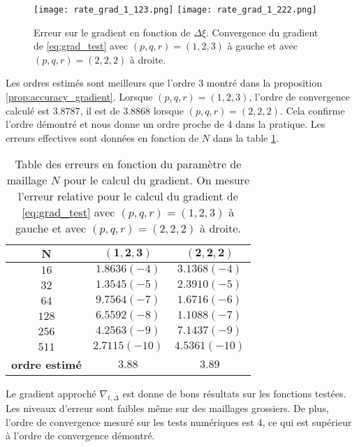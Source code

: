 \begin{figure}[htbp]
\begin{center}
\texttt{[image: rate\_grad\_1\_123.png]}
\texttt{[image: rate\_grad\_1\_222.png]}
\end{center}
\caption{Erreur sur le gradient en fonction de $\Delta \xi$. Convergence du gradient de \eqref{eq:grad_test} avec $(p,q,r)=(1,2,3)$ à gauche et avec $(p,q,r)=(2,2,2)$ à droite.}
\label{fig:rate_grad}
\end{figure}

Les ordres estimés sont meilleurs que l'ordre 3 montré dans la proposition \ref{prop:accuracy_gradient}. Lorsque $(p,q,r)=(1,2,3)$, l'ordre de convergence calculé est $3.8787$, il est de $3.8868$ lorsque $(p,q,r)=(2,2,2)$. Cela confirme l'ordre démontré et nous donne un ordre proche de $4$ dans la pratique. Les erreurs effectives sont données en fonction de $N$ dans la table \ref{tab:rate_grad}.

\begin{table}[htbp]
\begin{center}
\begin{tabular}{|c||c|c|}
\hline
$\mathbf{N}$    & $\mathbf{(1,2,3)}$     & $\mathbf{(2,2,2)}$     \\
\hline
\hline
$16$   & $1.8636 (-4)$ & $3.1368 (-4)$ \\
$32$   & $1.3545 (-5)$ & $2.3910 (-5)$ \\
$64$   & $9.7564 (-7)$ & $1.6716 (-6)$ \\
$128$  & $6.5592 (-8)$ & $1.1088 (-7)$ \\
$256$  & $4.2563 (-9)$ & $7.1437 (-9)$ \\
$511$  & $2.7115(-10)$ & $4.5361(-10)$ \\
\hline
\hline
\textbf{ordre estimé} & $3.88$ & $3.89$ \\
\hline 
\end{tabular}
\end{center}
\caption{Table des erreurs en fonction du paramètre de maillage $N$ pour le calcul du gradient. On mesure l'erreur relative pour le calcul du gradient de \eqref{eq:grad_test} avec $(p,q,r)=(1,2,3)$ à gauche et avec $(p,q,r)=(2,2,2)$ à droite.}
\label{tab:rate_grad}
\end{table}

Le gradient approché $\nabla_{t,\Delta}$ est donne de bons résultats sur les fonctions testées. Les niveaux d'erreur sont faibles même sur des maillages grossiers. De plus, l'ordre de convergence mesuré sur les tests numériques est 4, ce qui est supérieur à l'ordre de convergence démontré.













